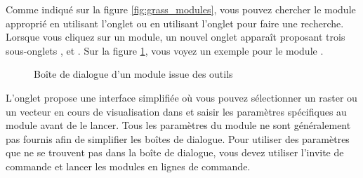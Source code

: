 Comme indiqué sur la figure \ref{fig:grass_modules}, vous pouvez chercher le module \grass approprié en utilisant l'onglet  ou en utilisant l'onglet  pour faire une recherche.
Lorsque vous cliquez sur un module, un nouvel onglet apparaît proposant trois sous-onglets ,  et . Sur la figure \ref{fig:grass_module_dialog}, vous voyez un exemple pour le module \grass {}.

\begin{figure}[ht]
\centering
   \hspace{0.2cm}
    \hspace{0.2cm}
 \caption{Boîte de dialogue d'un module issue des outils \grass \nixcaption}\label{fig:grass_module_dialog}  
\end{figure}


L'onglet  propose une interface simplifiée où vous pouvez sélectionner un raster ou un vecteur en cours de visualisation dans \qg et
saisir les paramètres spécifiques au module avant de le lancer. Tous les paramètres du module ne sont généralement pas fournis afin de simplifier
les boîtes de dialogue. Pour utiliser des paramètres que ne se trouvent pas dans la boîte de dialogue, vous devez utiliser l'invite de commande
et lancer les modules en lignes de commande.

